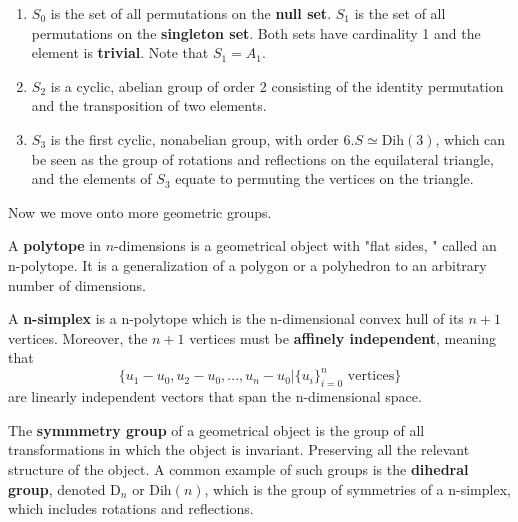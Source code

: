   \begin{example}
    \begin{enumerate}
      \item $S_{0}$ is the set of all permutations on the \textbf{null set}. $S_{1}$ is the set of all permutations on the \textbf{singleton set}. Both sets have cardinality 1 and the element is \textbf{trivial}. Note that $S_{1} = A_{1}$. 
      \item $S_{2}$ is a cyclic, abelian group of order 2 consisting of the identity permutation and the transposition of two elements. 
      \item $S_{3}$ is the first cyclic, nonabelian group, with order 6.$S \simeq \text{Dih}(3)$, which can be seen as the group of rotations and reflections on the equilateral triangle, and the elements of $S_{3}$ equate to permuting the vertices on the triangle. 
    \end{enumerate}
  \end{example}

  Now we move onto more geometric groups. 

  \begin{definition}
    A \textbf{polytope} in $n$-dimensions is a geometrical object with "flat sides, " called an n-polytope. It is a generalization of a polygon or a polyhedron to an arbitrary number of dimensions. 
  \end{definition}

  \begin{definition}
    A \textbf{n-simplex} is a n-polytope which is the n-dimensional convex hull of its $n+1$ vertices. Moreover, the $n+1$ vertices must be \textbf{affinely independent}, meaning that
    \begin{equation}
      \{u_1 - u_0, u_2 - u_0, ..., u_n - u_0 | \{u_i\}_{i=0}^{n} \text{ vertices} \}
    \end{equation}
    are linearly independent vectors that span the n-dimensional space. 
  \end{definition}

  \begin{definition}
    The \textbf{symmmetry group} of a geometrical object is the group of all transformations in which the object is invariant. Preserving all the relevant structure of the object. A common example of such groups is the \textbf{dihedral group}, denoted D$_{n}$ or Dih$(n)$, which is the group of symmetries of a n-simplex, which includes rotations and reflections. 
  \end{definition}


